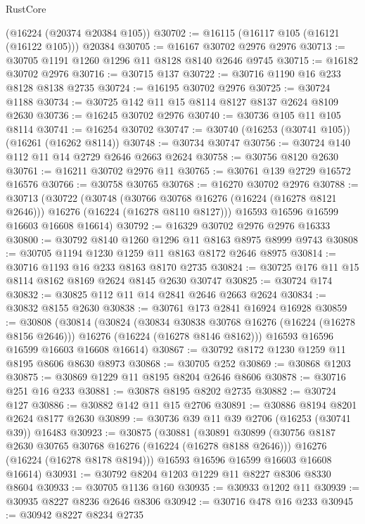 \begin{lexlean}{RustCore}
\begin{coremodule}
    (@16224 (@20374 @20384 @105))
@30702 := @16115 (@16117 @105 (@16121 (@16122 @105))) @20384
@30705 := @16167 @30702 @2976 @2976
@30713 := @30705 @1191 @1260 @1296 @11 @8128 @8140 @2646 @9745
@30715 := @16182 @30702 @2976
@30716 := @30715 @137
@30722 := @30716 @1190 @16 @233 @8128 @8138 @2735
@30724 := @16195 @30702 @2976
@30725 := @30724 @1188
@30734 := @30725 @142 @11 @15 @8114 @8127 @8137 @2624 @8109 @2630
@30736 := @16245 @30702 @2976
@30740 := @30736 @105 @11 @105 @8114
@30741 := @16254 @30702
@30747 := @30740 (@16253 (@30741 @105)) (@16261 (@16262 @8114))
@30748 := @30734 @30747
@30756 := @30724 @140 @112 @11 @14 @2729 @2646 @2663 @2624
@30758 := @30756 @8120 @2630
@30761 := @16211 @30702 @2976 @11
@30765 := @30761 @139 @2729 @16572 @16576
@30766 := @30758 @30765
@30768 := @16270 @30702 @2976
@30788 := @30713
    (@30722
      (@30748
        (@30766 @30768 @16276 (@16224 (@16278 @8121 @2646)))
        @16276
        (@16224 (@16278 @8110 @8127)))
      @16593
      @16596
      @16599
      @16603
      @16608
      @16614)
@30792 := @16329 @30702 @2976 @2976 @16333
@30800 := @30792 @8140 @1260 @1296 @11 @8163 @8975 @8999 @9743
@30808 := @30705 @1194 @1230 @1259 @11 @8163 @8172 @2646 @8975
@30814 := @30716 @1193 @16 @233 @8163 @8170 @2735
@30824 := @30725 @176 @11 @15 @8114 @8162 @8169 @2624 @8145 @2630 @30747
@30825 := @30724 @174
@30832 := @30825 @112 @11 @14 @2841 @2646 @2663 @2624
@30834 := @30832 @8155 @2630
@30838 := @30761 @173 @2841 @16924 @16928
@30859 := @30808
    (@30814
      (@30824
        (@30834 @30838 @30768 @16276 (@16224 (@16278 @8156 @2646)))
        @16276
        (@16224 (@16278 @8146 @8162)))
      @16593
      @16596
      @16599
      @16603
      @16608
      @16614)
@30867 := @30792 @8172 @1230 @1259 @11 @8195 @8606 @8630 @8973
@30868 := @30705 @252
@30869 := @30868 @1203
@30875 := @30869 @1229 @11 @8195 @8204 @2646 @8606
@30878 := @30716 @251 @16 @233
@30881 := @30878 @8195 @8202 @2735
@30882 := @30724 @127
@30886 := @30882 @142 @11 @15 @2706
@30891 := @30886 @8194 @8201 @2624 @8177 @2630
@30899 := @30736 @39 @11 @39 @2706 (@16253 (@30741 @39)) @16483
@30923 := @30875
    (@30881
      (@30891
        @30899
        (@30756 @8187 @2630 @30765 @30768 @16276 (@16224 (@16278 @8188 @2646)))
        @16276
        (@16224 (@16278 @8178 @8194)))
      @16593
      @16596
      @16599
      @16603
      @16608
      @16614)
@30931 := @30792 @8204 @1203 @1229 @11 @8227 @8306 @8330 @8604
@30933 := @30705 @1136 @160
@30935 := @30933 @1202 @11
@30939 := @30935 @8227 @8236 @2646 @8306
@30942 := @30716 @478 @16 @233
@30945 := @30942 @8227 @8234 @2735

\end{coremodule}
\end{lexlean}
